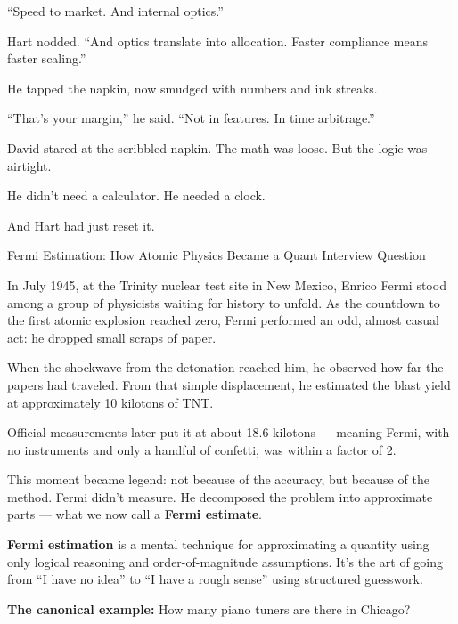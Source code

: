 ``Speed to market. And internal optics.''

Hart nodded. ``And optics translate into allocation. Faster compliance means faster scaling.''

He tapped the napkin, now smudged with numbers and ink streaks.

``That’s your margin,'' he said. ``Not in features. In time arbitrage.''

David stared at the scribbled napkin. The math was loose. But the logic was airtight.

He didn’t need a calculator. He needed a clock.

And Hart had just reset it.

\medskip


\begin{HistoricalSidebar}{Fermi Estimation: How Atomic Physics Became a Quant Interview Question}

  In July 1945, at the Trinity nuclear test site in New Mexico, Enrico Fermi stood among a group of physicists waiting for 
  history to unfold.  
  As the countdown to the first atomic explosion reached zero, Fermi performed an odd, almost casual act: he dropped small 
  scraps of paper.
  
  \medskip
  
  When the shockwave from the detonation reached him, he observed how far the papers had traveled.  
  From that simple displacement, he estimated the blast yield at approximately 10 kilotons of TNT.
  
  \medskip
  
  Official measurements later put it at about 18.6 kilotons — meaning Fermi, with no instruments and only a handful of confetti, 
  was within a factor of 2.
  
  \medskip
  
  This moment became legend: not because of the accuracy, but because of the method.  
  Fermi didn’t measure. He decomposed the problem into approximate parts — what we now call a \textbf{Fermi estimate}.
  
  \medskip
  
  \textbf{Fermi estimation} is a mental technique for approximating a quantity using only logical reasoning and 
  order-of-magnitude assumptions.  
  It’s the art of going from ``I have no idea'' to ``I have a rough sense'' using structured guesswork.
  
  \medskip
  
  \textbf{The canonical example:}  
  How many piano tuners are there in Chicago?


\end{HistoricalSidebar}
